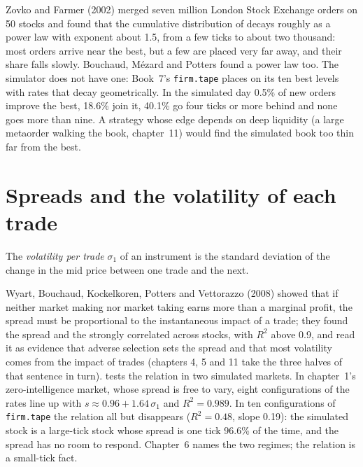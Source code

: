 Zovko and Farmer (2002) merged seven million London Stock Exchange orders on 50 stocks and found that the cumulative distribution of  decays roughly as a power law with exponent about 1.5, from a few ticks to about two thousand: most orders arrive near the best, but a few
are placed very far away, and their share falls slowly. Bouchaud, Mézard and Potters found a power law too. The simulator does not have one: Book~7's
\texttt{firm.tape} places  on its ten best levels with rates that decay geometrically. In the simulated day 0.5\% of new orders improve the
best, 18.6\% join it, 40.1\% go four ticks or more behind and none goes more than nine. A strategy whose edge depends on deep liquidity (a large
metaorder walking the book, chapter~11) would find the simulated book too thin far from the best.

\section{Spreads and the volatility of each trade}

\begin{definition}\label{def:mx:empirical-facts-of-order-books:vol}
The \emph{volatility per trade} $\sigma_1$ of an instrument is the standard deviation of the change in the mid price between
one trade and the next.
\end{definition}

Wyart, Bouchaud, Kockelkoren, Potters and Vettorazzo (2008) showed that if neither market making nor market taking earns more than a marginal profit,
the spread must be proportional to the instantaneous impact of a trade; they found the spread and the  strongly correlated
across stocks, with $R^2$ above 0.9, and read it as evidence that adverse selection sets the spread and that most volatility comes from the impact
of trades (chapters 4, 5 and 11 take the three halves of that sentence in turn).  tests the relation
in two simulated markets. In chapter~1's zero-intelligence market, whose spread is free to vary, eight configurations of the rates line up with
$s \approx 0.96 + 1.64\,\sigma_1$ and $R^2 = 0.989$. In ten configurations of \texttt{firm.tape} the relation all but disappears ($R^2=0.48$, slope 0.19):
the simulated stock is a large-tick stock whose spread is one tick 96.6\% of the time, and the spread has no room to respond. Chapter~6 names the two
regimes; the relation is a small-tick fact.

